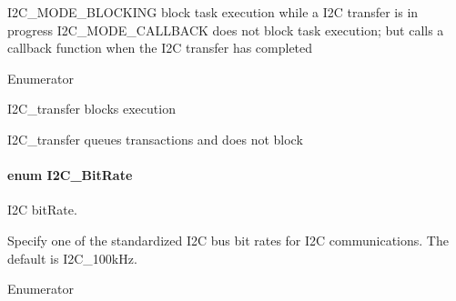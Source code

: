 I2\-C\-\_\-\-M\-O\-D\-E\-\_\-\-B\-L\-O\-C\-K\-I\-N\-G block task execution while a I2\-C transfer is in progress I2\-C\-\_\-\-M\-O\-D\-E\-\_\-\-C\-A\-L\-L\-B\-A\-C\-K does not block task execution; but calls a callback function when the I2\-C transfer has completed \begin{Desc}
\item[Enumerator]\par
\begin{description}
\item[{\em 
I2\-C\-\_\-\-M\-O\-D\-E\-\_\-\-B\-L\-O\-C\-K\-I\-N\-G\label{_i2_c_8h_a39f3b9340fc4ee241b0d2da9b2841c26abe065350be2a0ae5c9beb24624626c75}
}]I2\-C\-\_\-transfer blocks execution \item[{\em 
I2\-C\-\_\-\-M\-O\-D\-E\-\_\-\-C\-A\-L\-L\-B\-A\-C\-K\label{_i2_c_8h_a39f3b9340fc4ee241b0d2da9b2841c26a129731a7edeb285f43a54b2cf9f5ac72}
}]I2\-C\-\_\-transfer queues transactions and does not block \end{description}
\end{Desc}
\paragraph[{I2\-C\-\_\-\-Bit\-Rate}]{\setlength{\rightskip}{0pt plus 5cm}enum {\bf I2\-C\-\_\-\-Bit\-Rate}}\label{_i2_c_8h_ac954e3197f04c50293db466c4abb6fbe}


I2\-C bit\-Rate. 

Specify one of the standardized I2\-C bus bit rates for I2\-C communications. The default is I2\-C\-\_\-100k\-Hz. \begin{Desc}
\item[Enumerator]\par
\begin{description}
\item[{\em 
I2\-C\-\_\-100k\-Hz\label{_i2_c_8h_ac954e3197f04c50293db466c4abb6fbea966fd2df13b3a9825615c50335cf1987}
}]\item[{\em 
I2\-C\-\_\-400k\-Hz\label{_i2_c_8h_ac954e3197f04c50293db466c4abb6fbea83cc3750242e6ae9194cd7ed94f764d9}
}]\end{description}
\end{Desc}


